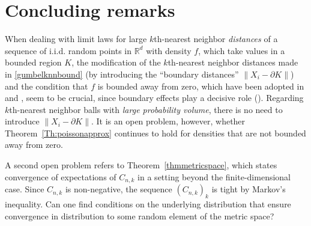 \documentclass{article}
\theoremstyle{thm}
\theoremstyle{definition}
\theoremstyle{definition}
\theoremstyle{def}
\begin{document}
\section{Concluding remarks}
When dealing with limit laws for large $k$th-nearest neighbor {\em distances} of a sequence of i.i.d. random points in $\mathbb{R}^d$ with density $f$, which take values in a bounded region $K$,
the modification of the $k$th-nearest neighbor distances made in \eqref{gumbelknnbound} (by introducing the ``boundary distances'' $\|X_i - \partial K\|$)
and  the condition that $f$ is bounded away from zero, which have been adopted in \cite{HE82} and \cite{HE83}, seem to be crucial, since boundary effects play
a decisive role (\cite{DH89, DH90}). Regarding $k$th-nearest neighbor balls with {\em large probability volume}, there is no need to introduce $\|X_i - \partial K\|$.
It is an open problem, however, whether Theorem~\ref{Th:poissonapprox} continues to hold for densities that are not bounded away from zero.

A second open problem refers to Theorem~\ref{thmmetricspace}, which states convergence of expectations of $C_{n,k}$ in a setting beyond the finite-dimensional case.
Since $C_{n,k}$ is non-negative, the sequence $(C_{n,k})_{k}$ is tight by Markov's inequality. Can one find conditions on the underlying distribution that ensure
convergence in distribution to some random element of the metric space?
\end{document}
